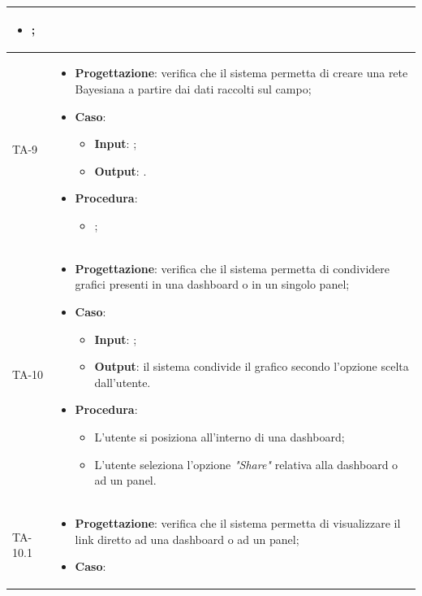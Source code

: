 \begin{longtable}{|C{2.5cm}|C{13cm}|}
\begin{itemize}
	\begin{itemize}
		\item ;
	\end{itemize} 
\end{itemize} \\
\hline
{TA-9} &
\begin{itemize}
	\item \textbf{Progettazione}: verifica che il sistema permetta di creare una rete Bayesiana a partire dai dati raccolti
	sul campo;
	\item \textbf{Caso}: 
	\begin{itemize}
		\item \textbf{Input}: ;
		\item \textbf{Output}: .
	\end{itemize}
	\item \textbf{Procedura}:
	\begin{itemize}
		\item ;
	\end{itemize} 
\end{itemize} \\
\hline
{TA-10} &
\begin{itemize}
	\item \textbf{Progettazione}: verifica che il sistema permetta di condividere grafici presenti in una dashboard o in un singolo panel;
	\item \textbf{Caso}: 
	\begin{itemize}
		\item \textbf{Input}: ;
		\item \textbf{Output}: il sistema condivide il grafico secondo l'opzione scelta dall'utente.
	\end{itemize}
	\item \textbf{Procedura}:
	\begin{itemize}
		\item L'utente si posiziona all'interno di una dashboard;
		\item L'utente seleziona l'opzione \emph{"Share"} relativa alla dashboard o ad un panel.
	\end{itemize} 
\end{itemize}\\
\hline
{TA-10.1} &
\begin{itemize}
	\item \textbf{Progettazione}: verifica che il sistema permetta di visualizzare il link diretto ad una dashboard o ad un
	panel;
	\item \textbf{Caso}: 
	\begin{itemize}

\end{itemize}
\end{itemize}
\end{longtable}
